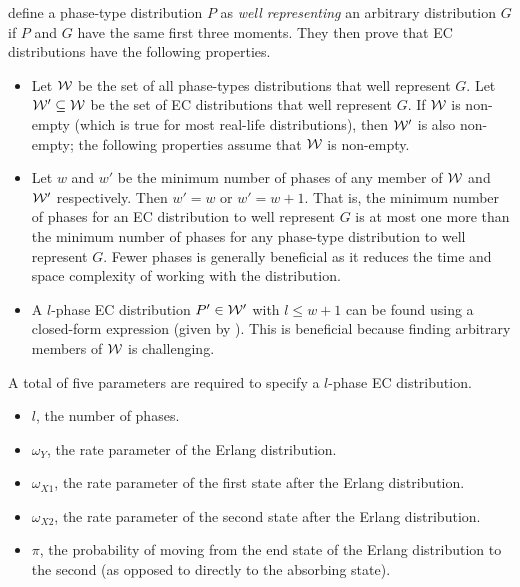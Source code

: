 \documentclass[thesis.tex]{subfiles}
\begin{document}
\Textcite{osogamiClosed} define a phase-type distribution $P$ as \emph{well representing} an arbitrary distribution $G$ if $P$ and $G$ have the same first three moments.
They then prove that EC distributions have the following properties.
\begin{itemize}
    \item Let $\mathcal{W}$ be the set of all phase-types distributions that well represent $G$.
        Let $\mathcal{W}' \subseteq \mathcal{W}$ be the set of EC distributions that well represent $G$.
        If $\mathcal{W}$ is non-empty (which is true for most real-life distributions), then $\mathcal{W'}$ is also non-empty; the following properties assume that $\mathcal{W}$ is non-empty.
    \item Let $w$ and $w'$ be the minimum number of phases of any member of $\mathcal{W}$ and $\mathcal{W'}$ respectively.
        Then $w' = w$ or $w' = w + 1$.
        That is, the minimum number of phases for an EC distribution to well represent $G$ is at most one more than the minimum number of phases for any phase-type distribution to well represent $G$.
        Fewer phases is generally beneficial as it reduces the time and space complexity of working with the distribution.
    \item A $l$-phase EC distribution $P' \in \mathcal{W'}$ with $l \leq w + 1$ can be found using a closed-form expression (given by \textcite{osogamiClosed}).
        This is beneficial because finding arbitrary members of $\mathcal{W}$ is challenging.
\end{itemize}

A total of five parameters are required to specify a $l$-phase EC distribution.
\begin{itemize}
    \item $l$, the number of phases.
    \item $\omega_Y$, the rate parameter of the Erlang distribution.
    \item $\omega_{X1}$, the rate parameter of the first state after the Erlang distribution.
    \item $\omega_{X2}$, the rate parameter of the second state after the Erlang distribution.
    \item $\pi$, the probability of moving from the end state of the Erlang distribution to the second (as opposed to directly to the absorbing state).
\end{itemize}
\end{document}
